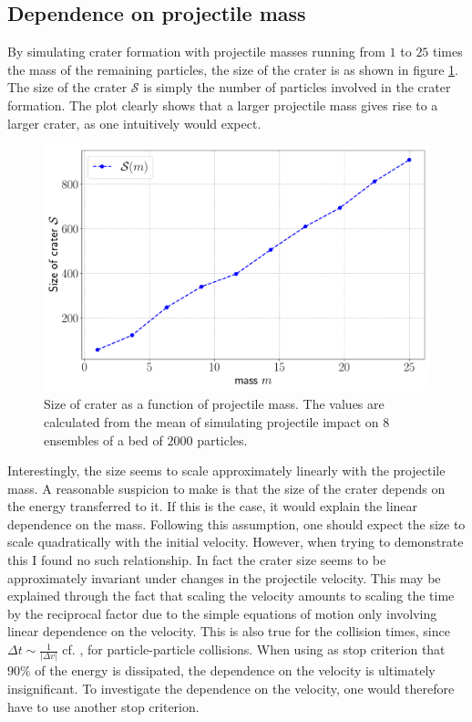 \subsection{Dependence on projectile mass}

By simulating crater formation with projectile masses running from $1$ to $25$ times the mass of the remaining particles, the size of the crater is as shown in figure \ref{fig:mass_size}. The size of the crater $\mathcal{S}$ is simply the number of particles involved in the crater formation. The plot clearly shows that a larger projectile mass gives rise to a larger crater, as one intuitively would expect. 

\begin{figure}
	\centering
	\includegraphics[width=0.9\columnwidth]{../fig/mass_size}
	\caption{Size of crater as a function of projectile mass. The values are calculated from the mean of simulating projectile impact on $8$ ensembles of a bed of $2000$ particles.}
	\label{fig:mass_size}
\end{figure}

Interestingly, the size seems to scale approximately linearly with the projectile mass. A reasonable suspicion to make is that the size of the crater depends on the energy transferred to it. If this is the case, it would explain the linear dependence on the mass. Following this assumption, one should expect the size to scale quadratically with the initial velocity. However, when trying to demonstrate this I found no such relationship. In fact the crater size seems to be approximately invariant under changes in the projectile velocity. This may be explained through the fact that scaling the velocity amounts to scaling the time by the reciprocal factor due to the simple equations of motion only involving linear dependence on the velocity. This is also true for the collision times, since $\Delta t \sim \frac{1}{|\Delta v|}$ cf. \cite{sheet}, for particle-particle collisions. When using as stop criterion that $90 \%$ of the energy is dissipated, the dependence on the velocity is ultimately insignificant. To  investigate the dependence on the velocity, one would therefore have to use another stop criterion.


